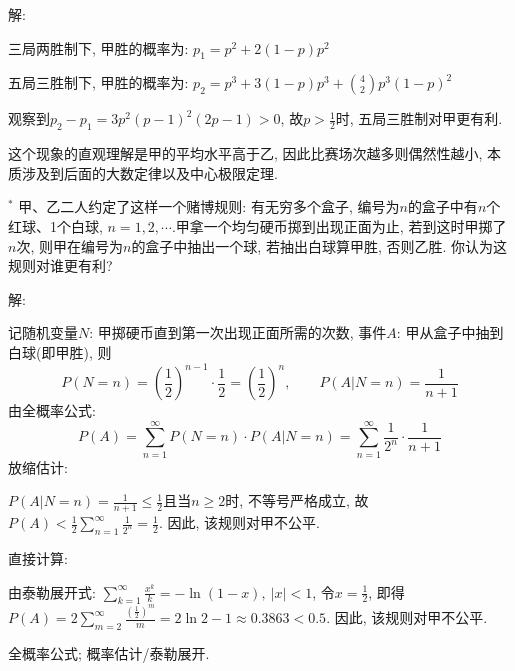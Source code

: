 \documentclass[standard]{ExBook}
\renewenvironment{shaded}{%
  \def\FrameCommand{\fboxsep=\FrameSep \colorbox{shadecolor}}%
  \MakeFramed{\advance\hsize-\width \FrameRestore}%
}{%
  \endMakeFramed
}
\begin{document}
\begin{qitems}
\vspace{\dimexpr2.5cm-5em\relax}

解:

三局两胜制下, 甲胜的概率为: $p_{1}=p^2+2(1-p)p^2$

五局三胜制下, 甲胜的概率为: $p_{2}=p^3+3(1-p)p^3+\binom{4}{2}p^3(1-p)^2$

观察到$p_{2}-p_{1}=3p^2(p-1)^2(2p-1)>0$, 故$p>\frac{1}{2}$时, 五局三胜制对甲更有利.

\textcolor{themeColor}{\selectfont {} 这个现象的直观理解是甲的平均水平高于乙, 因此比赛场次越多则偶然性越小, 本质涉及到后面的大数定律以及中心极限定理.}

\vspace{2.5cm-5em}

    \begin{bbox}
    \begin{shaded}
        \qitem$^*$
甲、乙二人约定了这样一个赌博规则: 有无穷多个盒子, 编号为$n$的盒子中有$n$个红球、1个白球, $n=1,2,\cdots$.甲拿一个均匀硬币掷到出现正面为止, 若到这时甲掷了$n$次, 则甲在编号为$n$的盒子中抽出一个球, 若抽出白球算甲胜, 否则乙胜. 你认为这规则对谁更有利?
    \end{shaded}
    \end{bbox}

\vspace{\dimexpr2.5cm-5em\relax}

解:

记随机变量$N$: 甲掷硬币直到第一次出现正面所需的次数, 事件$A$: 甲从盒子中抽到白球(即甲胜), 则
$$P(N=n)=(\frac{1}{2})^{n-1}\cdot\frac{1}{2}=(\frac{1}{2})^{n},\qquad P(A|N=n)=\frac{1}{n+1}$$
由全概率公式:
$$P(A)=\sum\limits_{n=1}^{\infty}P(N=n)\cdot P(A|N=n)=\sum\limits_{n=1}^{\infty}\frac{1}{2^n}\cdot\frac{1}{n+1}$$
 放缩估计: 

$P(A|N=n)=\frac{1}{n+1} \leq \frac{1}{2}$且当$n \geq 2$时, 不等号严格成立, 故$P(A) < \frac{1}{2}\sum\limits_{n=1}^{\infty}\frac{1}{2^n}=\frac{1}{2}$. 因此, 该规则对甲不公平.

 直接计算:

由泰勒展开式: $\sum\limits_{k=1}^{\infty}\frac{x^k}{k}=-\ln(1-x),\ |x|<1$, 令$x=\frac{1}{2}$, 即得$P(A)=2\sum\limits_{m=2}^{\infty}\frac{(\frac{1}{2})^m}{m}=2\ln2-1\approx0.3863<0.5$. 因此, 该规则对甲不公平.

\textcolor{themeColor}{\selectfont {} 全概率公式; 概率估计/泰勒展开.}

\vspace{2.5cm-5em}


\end{qitems}
\end{document}
